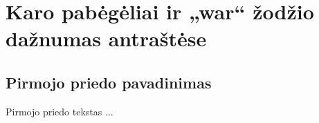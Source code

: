 \documentclass[a4paper,12pt,fleqn]{article}
\begin{document}
    {}{}{}{}%
    {}

    \tableofcontents

    


    \newpage
    \section{Karo pabėgėliai ir „war“ žodžio dažnumas antraštėse}
    \label{sec:refugees}
    



    





    \newpage
    \begin{appendices}
        \section{Pirmojo priedo pavadinimas}
        \label{app:a}
        Pirmojo priedo tekstas ...

    \end{appendices}
\end{document}

